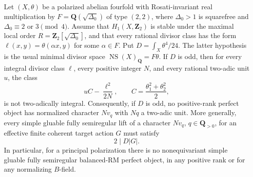 \begin{theorem}
\label{thm:semireg-rm-two-adic-obstruction}
Let $(X,\theta)$ be a polarized abelian
fourfold with Rosati-invariant real multiplication by
$F=\mathbf Q(\sqrt{\Delta_0})$ of type $(2,2)$, where
$\Delta_0>1$ is squarefree and
$\Delta_0\equiv2$ or $3\pmod4$.
Assume that $H_1(X,\mathbf Z_2)$ is stable under the
maximal local order
$R=\mathbf Z_2[\sqrt{\Delta_0}]$, and that every rational
divisor class has the form
$\ell(x,y)=\theta(\alpha x,y)$ for some $\alpha\in F$.
Put $D=\int_X\theta^4/24$.
The latter hypothesis is the usual minimal divisor space
$\operatorname{NS}(X)_{\mathbf Q}=F\theta$.
If $D$ is odd, then for every integral divisor class
$\ell$, every positive integer $N$, and every rational
two-adic unit $u$, the class
\[
 uC-\frac{\ell^2}{2N},\qquad
 C=\frac{\theta_1^2+\theta_2^2}{2},
 \tag{S32.1}
\]
is not two-adically integral. Consequently, if $D$ is odd,
no positive-rank perfect object has normalized character
$Nv_q$ with $Nq$ a two-adic unit.
More generally, every simple gluable fully semiregular
lift of a character $Nv_q$, $q\in\mathbf Q_{>0}$, for an effective finite coherent
target action $G$ must satisfy
\[
 2\mid D|G|.
 \tag{S32.1a}
\]
In particular, for a principal polarization there is no
nonequivariant simple gluable fully semiregular balanced-RM
perfect object, in any positive rank or for any
normalizing $B$-field.
\end{theorem}
